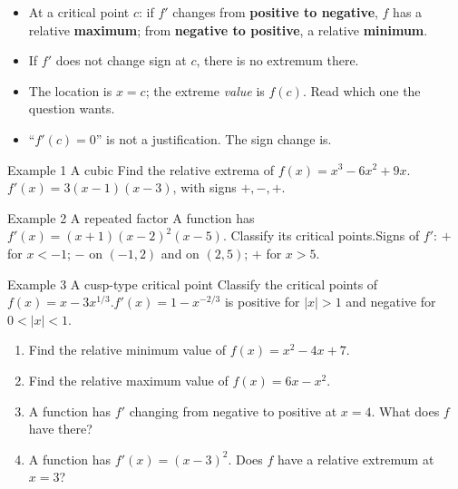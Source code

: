 \documentclass[11pt]{article}
\begin{document}

\begin{ideabox}
\begin{itemize}[leftmargin=*,itemsep=2pt,topsep=2pt]
  \item At a critical point $c$: if $f'$ changes from \textbf{positive to negative}, $f$ has a relative \textbf{maximum}; from \textbf{negative to positive}, a relative \textbf{minimum}.
  \item If $f'$ does not change sign at $c$, there is no extremum there.
  \item The location is $x=c$; the extreme \emph{value} is $f(c)$. Read which one the question wants.
  \item \textquotedblleft{}$f'(c)=0$\textquotedblright{} is not a justification. The sign change is.
\end{itemize}
\end{ideabox}

\begin{example}{Example 1 \textperiodcentered{} A cubic}
Find the relative extrema of $f(x)=x^3-6x^2+9x$.\soln $f'(x)=3(x-1)(x-3)$, with signs $+,-,+$.
\end{example}

\begin{example}{Example 2 \textperiodcentered{} A repeated factor}
A function has $f'(x)=(x+1)(x-2)^2(x-5)$. Classify its critical points.\soln Signs of $f'$: $+$ for $x<-1$; $-$ on $(-1,2)$ and on $(2,5)$; $+$ for $x>5$.
\end{example}

\begin{example}{Example 3 \textperiodcentered{} A cusp-type critical point}
Classify the critical points of $f(x)=x-3x^{1/3}$.\soln $f'(x)=1-x^{-2/3}$ is positive for $|x|>1$ and negative for $0<|x|<1$.
\end{example}

\newpage
{}

\begin{enumerate}[leftmargin=*,itemsep=2pt]
  \item Find the relative minimum value of $f(x)=x^2-4x+7$.\work{2.3cm}
  \item Find the relative maximum value of $f(x)=6x-x^2$.\work{2.3cm}
  \item A function has $f'$ changing from negative to positive at $x=4$. What does $f$ have there?\work{2.3cm}
  \item A function has $f'(x)=(x-3)^2$. Does $f$ have a relative extremum at $x=3$?\work{2.3cm}
\end{enumerate}
\end{document}
